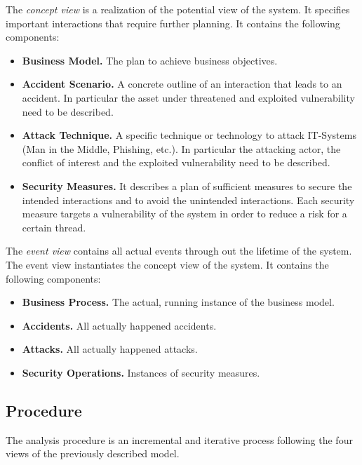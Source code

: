 The \emph{concept view} is a realization of the potential view of the system.
It specifies important interactions that require further planning.
It contains the following components:
\begin{itemize}
\item \textbf{Business Model.}
The plan to achieve business objectives.

\item \textbf{Accident Scenario.}
A concrete outline of an interaction that leads to an accident.
In particular the asset under threatened and exploited vulnerability need to be described.

\item \textbf{Attack Technique.}
A specific technique or technology to attack IT-Systems (Man in the Middle, Phishing, etc.).
In particular the attacking actor, the conflict of interest and the exploited vulnerability need to be described.

\item \textbf{Security Measures.}
It describes a plan of sufficient measures to secure the intended interactions and to avoid the unintended interactions.
Each security measure targets a vulnerability of the system in order to reduce a risk for a certain thread.
\end{itemize}




The \emph{event view} contains all actual events through out the lifetime of the system.
The event view instantiates the concept view of the system.
It contains the following components:
\begin{itemize}
\item \textbf{Business Process.}
The actual, running instance of the business model.

\item \textbf{Accidents.}
All actually happened accidents.

\item \textbf{Attacks.}
All actually happened attacks.

\item \textbf{Security Operations.}
Instances of security measures.
\end{itemize}


\subsection{Procedure}

The analysis procedure is an incremental and iterative process following the four views of the previously described model.

